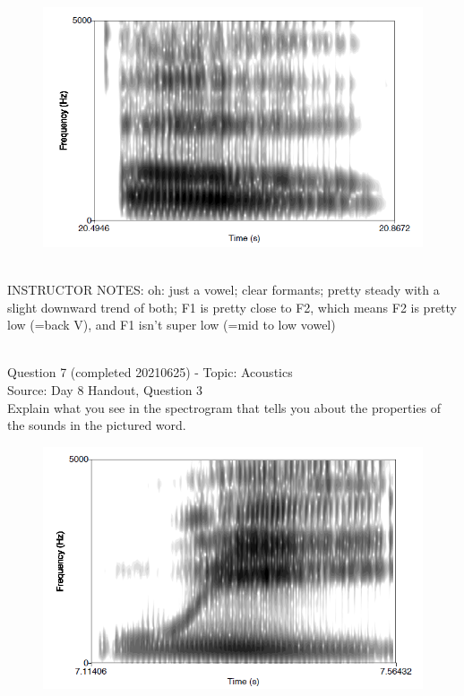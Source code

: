 \documentclass[12pt]{article}
\begin{document}
\begin{figure}[H]
\includegraphics{../images/spectrogram_oh.png}
\end{figure}

~\\
INSTRUCTOR NOTES: oh: just a vowel; clear formants; pretty steady with a slight downward trend of both; F1 is pretty close to F2, which means F2 is pretty low (=back V), and F1 isn't super low (=mid to low vowel)


~\\

{\large Question 7} (completed 20210625) - Topic: Acoustics\\
Source: Day 8 Handout, Question 3\\

Explain what you see in the spectrogram that tells you about the properties of the sounds in the pictured word.\\

\begin{figure}[H]
\includegraphics{../images/spectrogram_we.png}
\end{figure}
\end{document}
